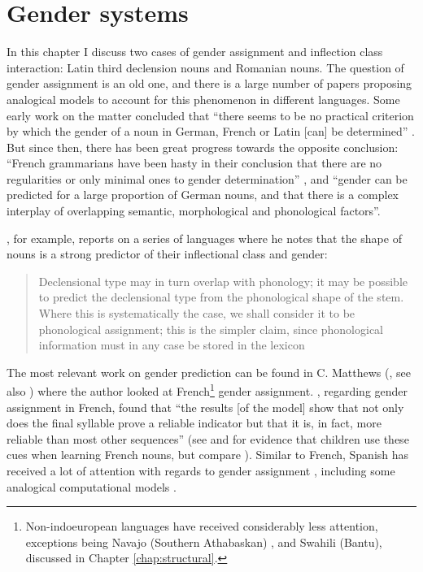 \chapter{Gender systems}\label{chap:gender-assignment}

In this chapter I discuss two cases of gender assignment and inflection class interaction: Latin third declension nouns and Romanian nouns. The question of gender assignment is an old one, and there is a large number of papers proposing analogical models to account for this phenomenon in different languages. Some early work on the matter concluded that ``there seems to be no practical criterion by which the gender of a noun in German, French or Latin [can] be determined'' \autocite[p. 280]{Bloomfield.1933a}. But since then, there has been great progress towards the opposite conclusion: ``French  grammarians  have  been  hasty  in  their  conclusion  that there are no regularities or only minimal ones to gender determination'' \autocite[316]{Tucker.1968}, and ``gender can be predicted for a large proportion of German nouns, and that there is a complex interplay of overlapping semantic, morphological and phonological factors''\autocite[p. 49]{Corbett.1991}.

\textcite{Corbett.1991}, for example, reports on a series of languages where he notes that the shape of nouns is a strong predictor of their inflectional class and gender:

\begin{quotation}
Declensional type may in turn overlap with phonology; it may be possible to predict the declensional type from the phonological shape of the stem. Where this is systematically the case, we shall consider it to be phonological assignment; this is the simpler claim, since phonological information must in any case be stored in the lexicon \autocite[p. 34]{Corbett.1991}
\end{quotation}

The most relevant work on gender prediction can be found in C. Matthews (, see also \cite{Lyster.2006}) where the author looked at French\footnote{Non-indoeuropean languages have received considerably less attention, exceptions being Navajo (Southern Athabaskan) \autocites{Eddington.2006, McDonough.2013}, and Swahili (Bantu), discussed in Chapter \ref{chap:structural}.} gender assignment. \textcite[p. 879]{Matthews.2010}, regarding gender assignment in French, found that ``the results [of the model] show that not only does the final syllable prove a reliable indicator but that it is, in fact, more reliable than most other sequences'' (see \textcite{Marchal.2007} and \textcite{Seigneuric.2007} for evidence that children use these cues when learning French nouns, but compare \textcite{Boloh.2010}). Similar to French, Spanish has received a lot of attention with regards to gender assignment \autocite{Morin.2006, Sanchez.1995, Smead.2000}, including some analogical computational models \autocite{Eddington.2002}.

